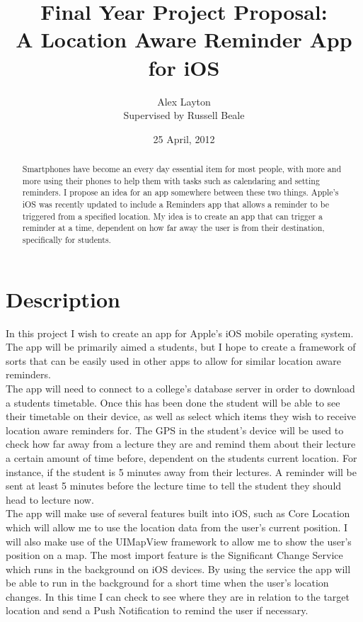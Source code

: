 \documentclass[12pt]{article}
\title{{\small Final Year Project Proposal:} \\ A Location Aware Reminder App for iOS}
\author{Alex Layton \\ {\small Supervised by Russell Beale}}
\date{25 April, 2012}
\begin{document}
\maketitle

\begin{abstract}
Smartphones have become an every day essential item for most people, with more and more using their phones to help them with tasks such as calendaring and setting reminders. I propose an idea for an app somewhere between these two things. Apple's iOS was recently updated to include a Reminders app that allows a reminder to be triggered from a specified location. My idea is to create an app that can trigger a reminder at a time, dependent on how far away the user is from their destination, specifically for students.     
\end{abstract}

\section*{Description}
In this project I wish to create an app for Apple's iOS mobile operating system. The app will be primarily aimed a students, but I hope to create a framework of sorts that can be easily used in other apps to allow for similar location aware reminders.\\ The app will need to connect to a college's database server in order to download a students timetable. Once this has been done the student will be able to see their timetable on their device, as well as select which items they wish to receive location aware reminders for. The GPS in the student's device will be used to check how far away from a lecture they are and remind them about their lecture a certain amount of time before, dependent on the students current location. For instance, if the student is 5 minutes away from their lectures. A reminder will be sent at least 5 minutes before the lecture time to tell the student they should head to lecture now.\\ The app will make use of several features built into iOS, such as Core Location which will allow me to use the location data from the user's current position. I will also make use of the UIMapView framework to allow me to show the user's position on a map. The most import feature is the Significant Change Service which runs in the background on iOS devices. By using the service the app will be able to run in the background for a short time when the user's location changes. In this time I can check to see where they are in relation to the target location and send a Push Notification to remind the user if necessary.
\end{document}
